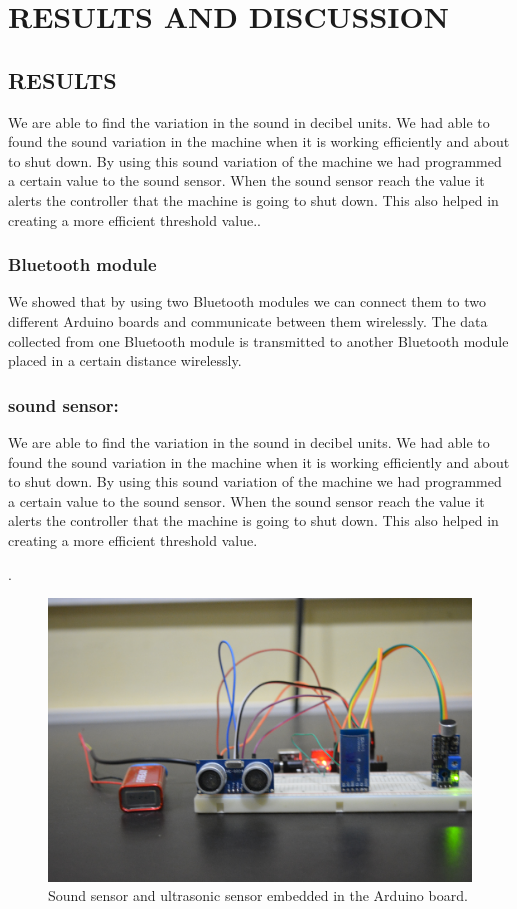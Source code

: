 \chapter{RESULTS AND DISCUSSION}
\section{RESULTS}
We are able to find the variation in the sound in decibel units. We had able to found the sound variation in the machine when it is working efficiently and about to shut down. By using this sound variation of the machine we had programmed a certain value to the sound sensor. When the sound sensor reach the value it alerts the controller that the machine is going to shut down. This also helped in creating a more efficient threshold value..
\subsection{Bluetooth module}
We showed that by using two Bluetooth modules we can connect them to two different Arduino boards and communicate between them wirelessly. The data collected from one Bluetooth module is transmitted to another Bluetooth module placed in a certain distance wirelessly.
\subsection{sound sensor:}
We are able to find the variation in the sound in decibel units. We had able to found the sound variation in the machine when it is working efficiently and about to shut down. By using this sound variation of the machine we had programmed a certain value to the sound sensor. When the sound sensor reach the value it alerts the controller that the machine is going to shut down. This also helped in creating a more efficient threshold value.

.
\newpage
\begin{figure}[h]
\centerline{\includegraphics[width=5.7in]{uc}}
\caption{ Sound sensor and ultrasonic sensor embedded in the Arduino board.}
\end{figure}
